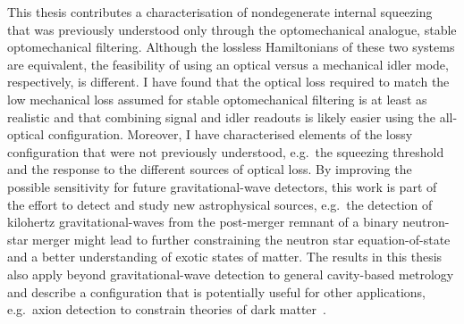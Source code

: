 This thesis contributes a characterisation of nondegenerate internal squeezing that was previously understood only through the optomechanical analogue, stable optomechanical filtering. Although the lossless Hamiltonians of these two systems are equivalent, the feasibility of using an optical versus a mechanical idler mode, respectively, is different. I have found that the optical loss required to match the low mechanical loss assumed for stable optomechanical filtering is at least as realistic and that combining signal and idler readouts is likely easier using the all-optical configuration. Moreover, I have characterised elements of the lossy configuration that were not previously understood, e.g.\ the squeezing threshold and the response to the different sources of optical loss.
By improving the possible sensitivity for future gravitational-wave detectors, this work is part of the effort to detect and study new astrophysical sources, e.g.\ the detection of kilohertz gravitational-waves from the post-merger remnant of a binary neutron-star merger might lead to further constraining the neutron star equation-of-state and a better understanding of exotic states of matter.
The results in this thesis also apply beyond gravitational-wave detection to general cavity-based metrology and describe a configuration that is potentially useful for other applications, e.g.\ axion detection to constrain theories of dark matter~\cite{}.



